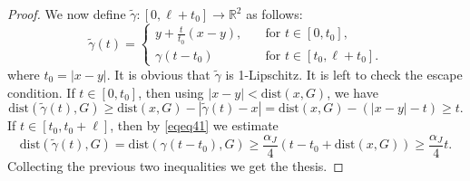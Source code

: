 \documentclass[10pt,a4paper]{amsart}
\newcommand{\R}{\mathbb{R}}
\begin{document}
\begin{proof}
    We now define $\tilde{\gamma}\colon[0,\ell+t_0] \longrightarrow \R^2$ as follows:
    \begin{equation}
        \tilde{\gamma}(t)=
        \begin{cases}
            y+\frac{t}{t_0}(x-y),\quad&\text{for }t\in[0,t_0],\\
            \gamma(t-t_0) &\text{for }t\in[t_0,\ell+t_0].
        \end{cases}
    \end{equation}
    where $t_0=|x-y|$.
    It is obvious that $\tilde{\gamma}$ is 1-Lipschitz. It is left to check the escape condition. If $t\in[0,t_0]$, then using 
    $|x-y|<\mathrm{dist}(x,G)$, we have
    \begin{equation}
        \mathrm{dist}(\tilde{\gamma}(t),G)\geq \mathrm{dist}(x,G)-|\tilde\gamma(t)-x|=\mathrm{dist}(x,G)-(|x-y|-t)\geq t.
    \end{equation}
    If $t\in[t_0,t_0+\ell]$, then by \eqref{eqeq41} we estimate
    \begin{equation}
        \mathrm{dist}(\tilde{\gamma}(t),G)=\mathrm{dist}(\gamma(t-t_0),G)\geq \frac{\alpha_J}{4}(t-t_0+\mathrm{dist}(x,G))\geq \frac{\alpha_J}{4}t.
    \end{equation}
    Collecting the previous two inequalities we get the thesis.
\end{proof}
\end{document}
